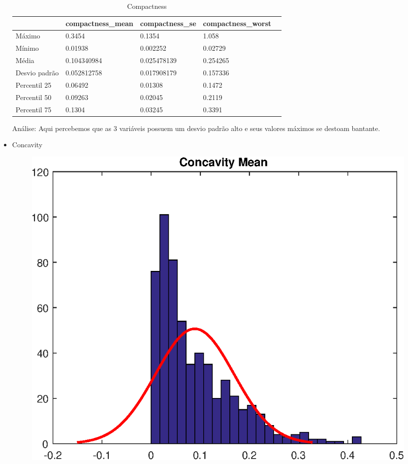 \documentclass[11pt,a4paper]{article}
\numberwithin{equation}{section}
\begin{document}
\begin{itemize}
\begin{table}[H]
\centering
\caption{Compactness}
\label{my-label}
\begin{tabular}{lllll}\hline
              & compactness\_mean & compactness\_se & compactness\_worst &  \\ \hline
Máximo        & 0.3454            & 0.1354          & 1.058              &  \\
Mínimo        & 0.01938           & 0.002252        & 0.02729            &  \\
Média         & 0.104340984       & 0.025478139     & 0.254265           &  \\
Desvio padrão & 0.052812758       & 0.017908179     & 0.157336           &  \\
Percentil 25  & 0.06492           & 0.01308         & 0.1472             &  \\
Percentil 50  & 0.09263           & 0.02045         & 0.2119             &  \\
Percentil 75  & 0.1304            & 0.03245         & 0.3391             &  \\ \hline
\end{tabular}
\end{table}

Análise: Aqui percebemos que as 3 variáveis possuem um desvio padrão alto e seus valores máximos se destoam bantante.

\item Concavity
\begin{figure}[H]
\centering
  \includegraphics[width=.4\linewidth]{./img/concavity_mean}
  \label{fig:test1}
\end{figure}%



\end{itemize}
\end{document}
